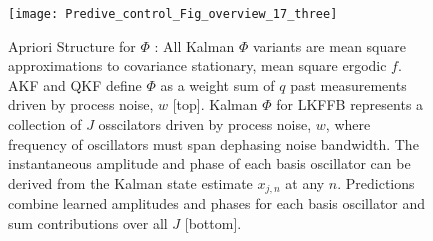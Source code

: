\begin{figure} [h]
    \texttt{[image: Predive\_control\_Fig\_overview\_17\_three]}
    \caption{\label{Predive_control_Fig_overview_17_three} Apriori Structure for $\Phi$ : All Kalman $\Phi$ variants are mean square approximations to covariance stationary, mean square ergodic $f$. AKF and QKF define $\Phi$ as a weight sum of $q$ past measurements driven by process noise, $w$ [top]. Kalman $\Phi$ for LKFFB represents a collection of $J$ osscilators driven by process noise, $w$, where frequency of oscillators must span dephasing noise bandwidth. The instantaneous amplitude and phase of each basis oscillator can be derived from the Kalman state estimate $x_{j, n}$ at any $n$. Predictions combine learned amplitudes and phases for each basis oscillator and sum contributions over all $J$ [bottom].}
\end{figure}

